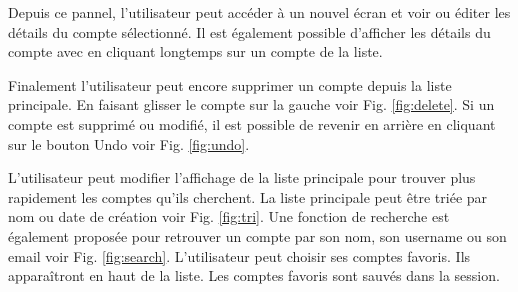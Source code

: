 \begin{center}
	\begin{minipage}{.3\textwidth}
	\end{minipage}
	\begin{minipage}{.3\textwidth}
	\end{minipage}
	\begin{minipage}{.3\textwidth}
	\end{minipage}        
\end{center}

Depuis ce pannel, l'utilisateur peut accéder à un nouvel écran et voir ou éditer les détails du compte sélectionné. Il est également possible d'afficher les détails du compte avec en cliquant longtemps sur un compte de la liste.

\begin{center}
	\begin{minipage}{.3\textwidth}
	\end{minipage}
	\begin{minipage}{.3\textwidth}
	\end{minipage}        
\end{center}

Finalement l'utilisateur peut encore supprimer un compte depuis la liste principale. En faisant glisser le compte sur la gauche voir Fig. \ref{fig:delete}. Si un compte est supprimé ou modifié, il est possible de revenir en arrière en cliquant sur le bouton Undo voir Fig. \ref{fig:undo}.

\begin{center}
	\begin{minipage}{.3\textwidth}
	\end{minipage}
	\begin{minipage}{.3\textwidth}
	\end{minipage}        
\end{center}

L'utilisateur peut modifier l'affichage de la liste principale pour trouver plus rapidement les comptes qu'ils cherchent. La liste principale peut être triée par nom ou date de création voir Fig. \ref{fig:tri}. Une fonction de recherche est également proposée pour retrouver un compte par son nom, son username ou son email voir Fig. \ref{fig:search}. L'utilisateur peut choisir ses comptes favoris. Ils apparaîtront en haut de la liste. Les comptes favoris sont sauvés dans la session.

